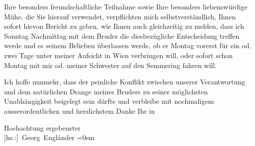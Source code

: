 \pstart
           Ihre besonders freundschaftliche Teilnahme sowie Ihre besonders liebenswürdige Mühe,
               die Sie hierauf verwendet, verpflichten mich selbstverständlich, Ihnen sofort hievon
               Bericht zu geben, wie Ihnen auch gleichzeitig zu melden, dass ich
                  Sonntag{ }{\pb}Nachmittag mit dem Bruder die diesbezügliche Entscheidung treffen werde und es
               seinem Belieben überlassen werde, ob er Montag vorerst für ein od. zwei
               Tage unter meiner Aufsicht in Wien verbringen
               will, oder sofort schon Montag mit mir od. meiner Schwester auf den Semmering fahren will.\pend
           
\pstart
           Ich hoffe nunmehr, dass der peinliche Konflikt zwischen unserer Verantwortung und dem
               natürlichen Drange meines Bruders zu seiner möglichsten Unabhängigkeit beigelegt sein dürfte und
               verbleibe mit nochmaligem ausserordentlichen und herzlichstem Danke Ihr in\pend
           
\pstart
           Hochachtung ergebenster{\\[\baselineskip]}\spacefill\mbox{{[}hs.:{]} Georg Engländer}\pend
           \leftskip=0em{}\endnumbering{}  \newcommand{\dateiname}{L02131}\newcommand{\titel}{Georg Engländer an Arthur Schnitzler, 25. 4. 1913}\newcommand{\editorInnen}{Martin Anton Müller und Gerd-Hermann Susen}
